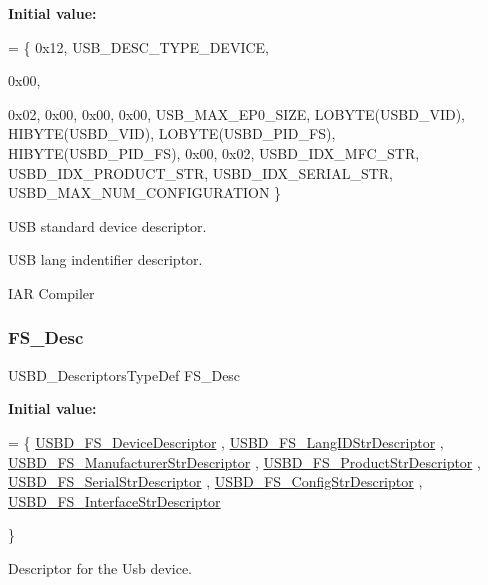 {\bfseries Initial value\+:}
\begin{DoxyCode}
=
\{
  0x12,                       
  USB\_DESC\_TYPE\_DEVICE,       





  0x00,                       

  0x02,
  0x00,                       
  0x00,                       
  0x00,                       
  USB\_MAX\_EP0\_SIZE,           
  LOBYTE(USBD\_VID),           
  HIBYTE(USBD\_VID),           
  LOBYTE(USBD\_PID\_FS),        
  HIBYTE(USBD\_PID\_FS),        
  0x00,                       
  0x02,
  USBD\_IDX\_MFC\_STR,           
  USBD\_IDX\_PRODUCT\_STR,       
  USBD\_IDX\_SERIAL\_STR,        
  USBD\_MAX\_NUM\_CONFIGURATION  
\}
\end{DoxyCode}
U\+SB standard device descriptor.

U\+SB lang indentifier descriptor.

I\+AR Compiler \mbox{\label{group__USBD__DESC__Private__Variables_gae36d67393118d9d8531a8d633e23a797}} 
\subsubsection{\texorpdfstring{F\+S\+\_\+\+Desc}{FS\_Desc}}
{\footnotesize\ttfamily U\+S\+B\+D\+\_\+\+Descriptors\+Type\+Def F\+S\+\_\+\+Desc}

{\bfseries Initial value\+:}
\begin{DoxyCode}
=
\{
  \hyperlink{group__USBD__DESC__Private__Functions_ga14798be38c08a37163e53167032485ff}{USBD\_FS\_DeviceDescriptor}
, \hyperlink{group__USBD__DESC__Private__Functions_gac02628ceb6a6a071e192dcb85063c0cc}{USBD\_FS\_LangIDStrDescriptor}
, \hyperlink{group__USBD__DESC__Private__Functions_ga6427a671827813efe1a46c3dfcb05683}{USBD\_FS\_ManufacturerStrDescriptor}
, \hyperlink{group__USBD__DESC__Private__Functions_ga0ec558c0303daabb851d584109a56514}{USBD\_FS\_ProductStrDescriptor}
, \hyperlink{group__USBD__DESC__Private__Functions_gaad2a1d1451821845eda602a82b1cd213}{USBD\_FS\_SerialStrDescriptor}
, \hyperlink{group__USBD__DESC__Private__Functions_ga40ed2a0fb60c50a285983a09ba6921d6}{USBD\_FS\_ConfigStrDescriptor}
, \hyperlink{group__USBD__DESC__Private__Functions_gab248f43276f92d982ab5853111e4fb10}{USBD\_FS\_InterfaceStrDescriptor}


 
\}
\end{DoxyCode}
Descriptor for the Usb device. 